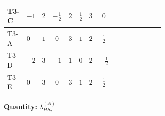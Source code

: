\documentclass[8pt]{article}
\begin{document}
\begin{landscape}
\begin{longtable}{@{}llcccccc >{\raggedright\arraybackslash}p{0.21\linewidth} >{\raggedright\arraybackslash}p{0.21\linewidth} >{\raggedright\arraybackslash}p{0.21\linewidth}@{}}
\midrule
T3-C & $-1$ & $2$ & $-\frac{1}{2}$ & $2$ & $\frac{1}{2}$ & $3$ & $0$ & \scriptsize\adjustbox{max width=\linewidth}{$\begin{gathered} +16 {\lambda_5} \left({\lambda_5}\right)^{*}\end{gathered}$} & \scriptsize\adjustbox{max width=\linewidth}{$\begin{gathered} +{g_1}^2 \left(6 {g_2}^2-3 {\lambda_{HS_2}^{(A)}}\right)\end{gathered}$} & \scriptsize\adjustbox{max width=\linewidth}{$\begin{gathered} -9 {g_2}^2 {\lambda_{HS_2}^{(A)}}\end{gathered}$} \\
\midrule
T3-A & $0$ & $1$ & $0$ & $3$ & $1$ & $2$ & $\frac{1}{2}$ & --- & --- & --- \\
\midrule
T3-D & $-2$ & $3$ & $-1$ & $1$ & $0$ & $2$ & $-\frac{1}{2}$ & --- & --- & --- \\
\midrule
T3-E & $0$ & $3$ & $0$ & $3$ & $1$ & $2$ & $\frac{1}{2}$ & --- & --- & --- \\
\midrule
\bottomrule
\end{longtable}
\clearpage
\noindent\textbf{Quantity: }$\lambda_{HS_2}^{(A)}$\par\smallskip

\end{landscape}
\end{document}
